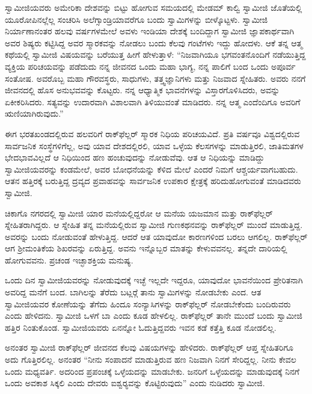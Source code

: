  ಸ್ವಾಮೀಜಿಯವರು ಅಮೇರಿಕಾ ದೇಶವನ್ನು ಬಿಟ್ಟು ಹೋಗುವ ಸಮಯದಲ್ಲಿ ಮೇಡಮ್ ಕಾಲ್ವಿ ಸ್ವಾಮೀಜಿ ಜೊತೆಯಲ್ಲಿ ಯೂರೋಪಿನಲ್ಲೆಲ್ಲ ಸಂಚರಿಸಿ ಅಲೆಗ್ಸಾಂಡ್ರಿಯಾವರೆಗೂ ಬಂದು ಸ್ವಾಮಿಗಳನ್ನು ಬೀಳ್ಕೊಟ್ಟಳು. ಸ್ವಾಮೀಜಿ ನಿರ್ಯಾಣಾನಂತರ ಹಲವು ವರ್ಷಗಳಮೇಲೆ ಅವಳು ಇಂಡಿಯಾ ದೇಶಕ್ಕೆ ಬಂದಿದ್ದಾಗ ಸ್ವಾಮೀಜಿ ಜ್ಞಾಪಕಾರ್ಥವಾಗಿ ಅವರ ಶಿಷ್ಯರು ಕಟ್ಟಿಸಿದ್ದ ಅವರ ಸ್ಮಾರಕವನ್ನು ನೋಡಲು ಬಂದು ಕೆಲವು ಗಂಟೆಗಳು ಇದ್ದು ಹೋದಳು. ಆಕೆ ತನ್ನ ಆತ್ಮ ಕಥೆಯಲ್ಲಿ ಸ್ವಾಮೀಜಿ ವಿಷಯವನ್ನು ಬರೆಯುತ್ತ ಹೀಗೆ ಹೇಳುತ್ತಾಳೆ: “ನಿಜವಾಗಿಯೂ ಭಗವಂತನೊಂದಿಗೆ ನಡೆಯುತ್ತಿದ್ದ ವ್ಯಕ್ತಿಯ ಪರಿಚಯವನ್ನು ಪಡೆದುದು ನನ್ನ ಜೀವನದ ಒಂದು ಮಹಾ ಭಾಗ್ಯ, ನನ್ನ ಪಾಲಿಗೆ ಬಂದ ಒಂದು ಅಪೂರ್ವ ಸಂತೋಷ. ಅವರೊಬ್ಬ ಮಹಾ ಗೌರವಸ್ಥರು, ಸಾಧುಗಳು, ತತ್ತ್ವಜ್ಞಾನಿಗಳು ಮತ್ತು ನಿಜವಾದ ಸ್ನೇಹಿತರು. ಅವರು ನನಗೆ ಜೀವನದಲ್ಲಿ ಹೊಸ ಅನುಭವವನ್ನು ಕೊಟ್ಟರು. ನನ್ನ ಆಧ್ಯಾತ್ಮಿಕ ಭಾವನೆಗಳನ್ನು ವಿಸ್ತಾರಗೊಳಿಸಿದರು, ಅವನ್ನು ಏಕೀಕರಿಸಿದರು. ಸತ್ಯವನ್ನು ಉದಾರವಾಗಿ ವಿಶಾಲವಾಗಿ ತಿಳಿಯುವಂತೆ ಮಾಡಿದರು. ನನ್ನ ಆತ್ಮ ಎಂದೆಂದಿಗೂ ಅವರಿಗೆ ಋಣಿಯಾಗಿರುವುದು.” 

 ಈಗ ಭರತಖಂಡದಲ್ಲಿರುವ ಹಲವರಿಗೆ ರಾಕ್‍ಫೆಲ್ಲರ್ ಸ್ಮಾರಕ ನಿಧಿಯ ಪರಿಚಯವಿದೆ. ಪ್ರತಿ ವರ್ಷವೂ ವಿಶ್ವದಲ್ಲಿರುವ ಸಾರ್ವಜನಿಕ ಸಂಸ್ಥೆಗಳಿಗೆಲ್ಲ, ಅವು ಯಾವ ದೇಶದಲ್ಲಿರಲಿ, ಯಾವ ಒಳ್ಳೆಯ ಕೆಲಸಗಳನ್ನು ಮಾಡುತ್ತಿರಲಿ, ಜಾತಿಮತಗಳ ಭೇದಭಾವವಿಲ್ಲದೆ ಆ ನಿಧಿಯಿಂದ ಹಣ ಹಂಚುವುದನ್ನು ನೋಡುವೆವು. ಆತ ಆ ನಿಧಿಯನ್ನು ಮಾಡಿದ್ದು ಸ್ವಾಮೀಜಿಯವರನ್ನು ಕಂಡಮೇಲೆ, ಅವರ ಬೋಧನೆಯನ್ನು ಕೆಳಿದ ಮೇಲೆ ಎಂದರೆ ನಿಮಗೆ ಆಶ್ಚರ್ಯವಾಗಬಹುದು. ಆತನ ಹತ್ತಿರಕ್ಕೆ ಬರುತ್ತಿದ್ದ ದ್ರವ್ಯದ ಪ್ರವಾಹವನ್ನು ಸಾರ್ವಜನಿಕ ಉಪಕಾರ ಕ್ಷೇತ್ರಕ್ಕೆ ಹರಿದುಹೋಗುವಂತೆ ಮಾಡಿದವರು ಸ್ವಾಮೀಜಿ. 

 ಚಿಕಾಗೊ ನಗರದಲ್ಲಿ ಸ್ವಾಮೀಜಿ ಯಾರ ಮನೆಯಲ್ಲಿದ್ದರೋ ಆ ಮನೆಯ ಯಜಮಾನ ಮತ್ತು ರಾಕ್‍ಫೆಲ್ಲರ್ ಸ್ನೇಹಿತರಾಗಿದ್ದರು. ಆ ಸ್ನೇಹಿತ ತನ್ನ ಮನೆಯಲ್ಲಿರುವ ಸ್ವಾಮೀಜಿ ಗುಣಕಥನವನ್ನು ರಾಕ್‍ಫೆಲ್ಲರ್ ಮುಂದೆ ಮಾಡುತ್ತಿದ್ದ. ಅವರನ್ನು ಬಂದು ನೋಡುವಂತೆ ಹೇಳುತ್ತಿದ್ದ. ಆದರೆ ಆತ ಯಾವುದೋ ಕಾರಣಗಳಿಂದ ಬರಲು ಆಗಲಿಲ್ಲ. ರಾಕ್‍ಫೆಲ್ಲರ್ ಆಗ ಶ‍್ರೀಮಂತಿಕೆಯ ಶಿಖರವನ್ನು ಏರುತ್ತಿದ್ದ. ಅವನು ಇನ್ನೊಬ್ಬರ ಮಾತನ್ನು ಕೇಳುವವನಲ್ಲ. ತನ್ನದೇ ದಾರಿಯಲ್ಲಿ ಹೋಗುವವನು. ಪ್ರಚಂಡ ಇಚ್ಛಾಶಕ್ತಿಯ ಮನುಷ್ಯ. 

 ಒಂದು ದಿನ ಸ್ವಾಮೀಜಿಯವರನ್ನು ನೋಡುವುದಕ್ಕೆ ಇಚ್ಛೆ ಇಲ್ಲದೇ ಇದ್ದರೂ, ಯಾವುದೋ ಭಾವನೆಯಿಂದ ಪ್ರೇರಿತನಾಗಿ ಅವರಿದ್ದ ಮನೆಗೆ ಬಂದ. ಬಾಗಿಲನ್ನು ತೆರೆದು ಬಟ್ಲರ್‍ಗೆ ತಾನು ಸ್ವಾಮಿಗಳನ್ನು ನೋಡಬೇಕು ಎಂದ. ಆತ ಸ್ವಾಮೀಜಿಯವರ ಕೋಣೆಯನ್ನು ತೆಗೆದು ಹಿಂದೂ ಸಂನ್ಯಾಸಿಗಳನ್ನು ರಾಕ್‍ಫೆಲ್ಲರ್ ನೋಡಬೇಕೆಂದು ಬಂದಿರುವರು ಎಂದು ಹೇಳಿದನು. ಸ್ವಾಮೀಜಿ ಒಳಗೆ ಬಾ ಎಂದು ಕೂಡ ಹೇಳಲಿಲ್ಲ. ರಾಕ್‍ಫೆಲ್ಲರ್ ತಾನೇ ಮುಂದೆ ಬಂದು ಸ್ವಾಮೀಜಿ ಹತ್ತಿರ ನಿಂತುಕೊಂಡ. ಸ್ವಾಮೀಜಿಯವರು ಏನನ್ನೋ ಓದುತ್ತಿದ್ದವರು ಇವನ ಕಡೆ ಕತ್ತೆತ್ತಿ ಕೂಡ ನೋಡಲಿಲ್ಲ. 

 ಅನಂತರ ಸ್ವಾಮೀಜಿ ರಾಕ್‍ಫೆಲ್ಲರ್ ಜೀವನದ ಕೆಲವು ವಿಷಯಗಳನ್ನು ಹೇಳಿದರು. ರಾಕ್‍ಫೆಲ್ಲರ್ ಆಪ್ತ ಸ್ನೇಹಿತರಿಗೂ ಅದು ಗೊತ್ತಿರಲಿಲ್ಲ. ಅನಂತರ “ನೀನು ಸಂಪಾದನೆ ಮಾಡುತ್ತಿರುವ ಹಣ ನಿಜವಾಗಿ ನಿನಗೆ ಸೇರಿದ್ದಲ್ಲ. ನೀನು ಕೇವಲ ಒಂದು ಮಧ್ಯವರ್ತಿ. ಅದರಿಂದ ಪ್ರಪಂಚಕ್ಕೆ ಒಳ್ಳೆಯದನ್ನು ಮಾಡಬೇಕು. ಜನರಿಗೆ ಒಳ್ಳೆಯದನ್ನು ಮಾಡುವುದಕ್ಕೆ ನಿನಗೆ ಒಂದು ಅವಕಾಶ ಸಿಕ್ಕಲಿ ಎಂದು ದೇವರು ಐಶ್ವರ‍್ಯವನ್ನು ಕೊಟ್ಟಿರುವುದು” ಎಂದು ನುಡಿದರು ಸ್ವಾಮೀಜಿ. 

